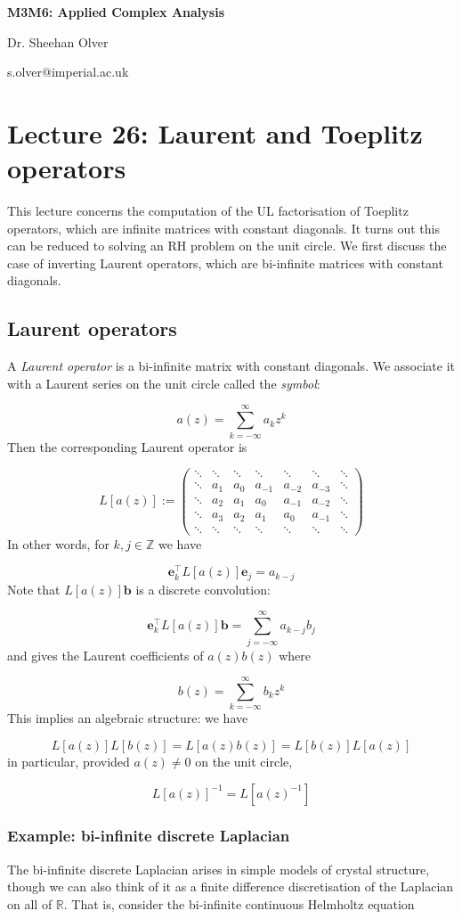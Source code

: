 \documentclass[12pt,a4paper]{article}
\def\R{ {\mathbb R} }
\def\Z{ {\mathbb Z} }
\def\vc#1{ {\mathbf #1} }
\def\sopmatrix#1{ \begin{pmatrix}#1\end{pmatrix} }
\begin{document}
\textbf{M3M6: Applied Complex Analysis}

Dr. Sheehan Olver

s.olver@imperial.ac.uk

\section{Lecture 26: Laurent and Toeplitz operators}
This lecture concerns the computation of the UL factorisation of Toeplitz operators, which are infinite matrices with constant diagonals.  It turns out this can be reduced to solving an RH problem on the unit circle.  We first discuss the case of inverting Laurent operators, which are bi-infinite matrices with constant diagonals.

\subsection{Laurent operators}
A \emph{Laurent operator} is a bi-infinite matrix with constant diagonals. We associate it with a Laurent series on the unit circle called the \emph{symbol}:

\[
a(z) = \sum_{k=-\infty}^\infty a_k z^k
\]
Then the corresponding Laurent operator is

\[
L[a(z)] := \sopmatrix{
\ddots & \ddots & \ddots& \ddots& \ddots& \ddots& \ddots \\
\ddots  & a_1 & a_0 & a_{-1} & a_{-2} & a_{-3} & \ddots \\
\ddots  & a_2 & a_1 & a_0 & a_{-1} & a_{-2} & \ddots \\
\ddots  & a_3 & a_2 & a_1 & a_0 & a_{-1} &  \ddots \\
\ddots & \ddots & \ddots& \ddots& \ddots& \ddots& \ddots
}
\]
In other words, for $k,j \in \Z$ we have

\[
\vc e_k^\top L[a(z)] \vc e_j = a_{k-j}
\]
Note that $L[a(z)] \vc b$ is a discrete convolution:

\[
\vc e_k^\top L[a(z)] \vc b = \sum_{j=-\infty}^\infty a_{k-j} b_j
\]
and gives the Laurent coefficients of $a(z) b(z)$ where

\[
b(z) = \sum_{k=-\infty}^\infty b_k z^k
\]
This implies an algebraic structure: we have 

\[
L[a(z)] L[b(z)] = L[a(z)b(z)] = L[b(z)] L[a(z)]
\]
in particular, provided $a(z) \neq 0$ on the unit circle,

\[
L[a(z)]^{-1} = L[a(z)^{-1}]
\]
\subsubsection{Example: bi-infinite discrete Laplacian}
The bi-infinite discrete Laplacian arises in simple models of crystal structure, though we can also think of it as a finite difference discretisation of the Laplacian on all of $\R$.  That is, consider the bi-infinite continuous Helmholtz equation
\end{document}
